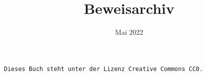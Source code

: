 \documentclass[a4paper,10pt,fleqn,twoside]{scrbook}
\title{Beweisarchiv}
\date{Mai 2022}
\numberwithin{equation}{chapter}
\theoremstyle{rmbox}
\begin{document}
\maketitle

\texttt{Dieses Buch steht unter der Lizenz Creative Commons CC0.}

\tableofcontents










\printindex
\end{document}

